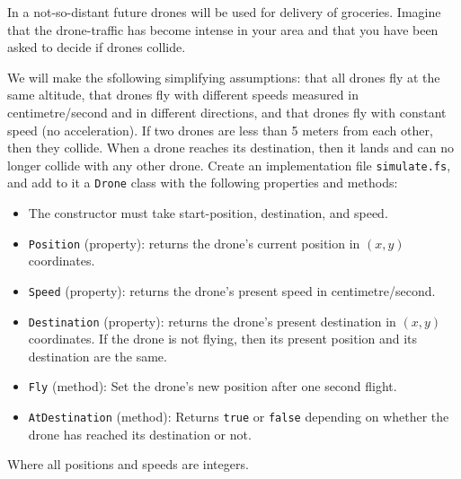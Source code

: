 In a not-so-distant future drones will be used for delivery of
groceries. Imagine that the drone-traffic has become intense in your
area and that you have been asked to decide if drones collide.

We will make the sfollowing simplifying assumptions: that all drones
fly at the same altitude, that drones fly with different speeds
measured in centimetre/second and in different directions, and that
drones fly with constant speed (no acceleration). If two drones are
less than 5 meters from each other, then they collide. When a drone
reaches its destination, then it lands and can no longer collide with
any other drone. Create an implementation file
\lstinline{simulate.fs}, and add to it a \lstinline{Drone} class with
the following properties and methods:

\begin{itemize}
\item The constructor must take start-position, destination, and speed.

\item \lstinline{Position} (property): returns the drone's current
  position in $(x, y)$ coordinates.

\item \lstinline{Speed} (property): returns the drone's present speed
  in centimetre/second.

\item \lstinline{Destination} (property): returns the drone's present
  destination in $(x, y)$ coordinates. If the drone is not flying,
  then its present position and its destination are the same.

\item \lstinline{Fly} (method): Set the drone's new position after one
  second flight.

\item \lstinline{AtDestination} (method): Returns \lstinline{true} or
  \lstinline{false} depending on whether the drone has reached its
  destination or not.
\end{itemize}

Where all positions and speeds are integers.

